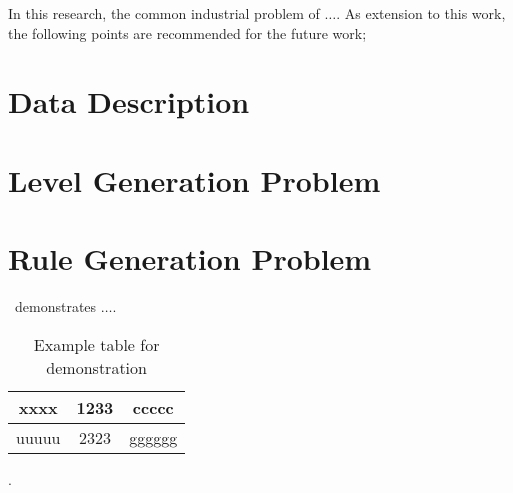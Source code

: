 In this research, the common industrial problem of $\ldots$. As extension to this work, the following points are recommended for the future work;

\section{Data Description}
\section{Level Generation Problem}
\section{Rule Generation Problem}


~demonstrates $\ldots$.


\begin{table}[!ht]
	\label{Table:l1}
	\centering
	\begin{tabular}{|c|c|c|}
		\hline
		xxxx & 1233 & ccccc \\
		\hline
		uuuuu & 2323 & gggggg \\
		\hline
	\end{tabular}
	\caption{Example table for demonstration}
\end{table}

.

\begin{landscape}
\end{landscape}
